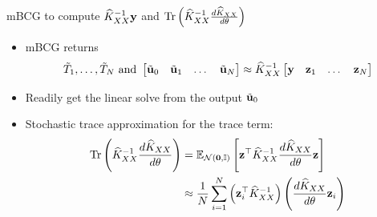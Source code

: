 \documentclass{beamer}
\begin{document}
\begin{frame}{mBCG to compute {\normalsize $\widehat K_{XX}^{-1} \boldsymbol{\mathbf{y}}$} and \normalsize{$\operatorname{Tr} \left(\widehat K_{XX}^{-1} \frac{d \widehat K_{XX}}{d\theta} \right)$}}
\begin{itemize}[<+->]
    \item mBCG returns
    \begin{equation*}
        \tilde T_1, \ldots, \tilde T_N \text{ and } \begin{bmatrix} \tilde{\boldsymbol{\mathbf{u}}}_0 & \tilde{\boldsymbol{\mathbf{u}}}_1 & \dots & \tilde{\boldsymbol{\mathbf{u}}}_N \end{bmatrix} \approx 
    \widehat K_{XX}^{-1} \begin{bmatrix} \boldsymbol{\mathbf{y}} & \boldsymbol{\mathbf{z}}_1 & \dots & \boldsymbol{\mathbf{z}}_N \end{bmatrix}
    \end{equation*}
    \item Readily get the linear solve from the output $\tilde{\boldsymbol{\mathbf{u}}}_0$
    \item Stochastic trace approximation for the trace term:
    \begin{align*}
        \trace \left(\widehat K_{XX}^{-1} \frac{d \widehat K_{XX}}{d\theta} \right) 
        &= \E_{\mathcal N(\vect 0, \Id)} \left[ \vect z^\top \widehat K_{XX}^{-1}  \frac{d \widehat K_{XX}}{d\theta} \vect z \right]\\
        &\approx \frac{1}{N} \sum_{i=1}^N \left( \vect z_i^\top \widehat K_{XX}^{-1} \right) \left( \frac{d \widehat K_{XX}}{d\theta} \vect z_i \right)
    \end{align*}
\end{itemize}
\end{frame}
\end{document}
